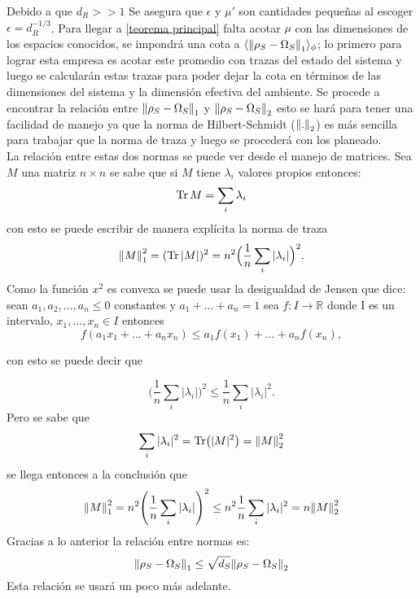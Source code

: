Debido a que $d_{R}>>1$ Se asegura que $\epsilon$ y $\mu'$ son cantidades pequeñas al escoger $\epsilon=d_{R}^{-1/3}$. Para llegar a \ref{teorema principal} falta acotar $\mu$ con las dimensiones de los espacios conocidos, se impondrá una cota a $\langle \norm{\rho_{S} -\Omega_{S}}_{1} \rangle_{\phi}$; lo primero  para lograr esta empresa es acotar este promedio con trazas del estado del sistema  y luego se calcularán estas trazas para poder dejar la cota en términos de las dimensiones del sistema y la dimensión efectiva del ambiente. Se procede a encontrar la relación entre $\norm{\rho_{S} -\Omega_{S}}_{1}$ y $\norm{\rho_{S} -\Omega_{S}}_{2}$ esto se hará para tener una facilidad de manejo ya que la norma de Hilbert-Schmidt ($\norm{.}_{2}$) es más sencilla para trabajar que la norma de traza y luego se procederá con los planeado.
\\
La relación entre estas dos normas se puede ver desde el manejo de matrices. Sea $M$ una matriz $n \times n$ se sabe que si $M$ tiene $\lambda_{i}$ valores propios entonces:
\begin{equation}
\Tr M= \sum_{i} \lambda_{i}
\end{equation}
con esto se puede escribir de manera explícita la norma de traza 
\begin{equation}
\norm{M}_{1}^2=(\Tr|M|)^{2}=n^{2} \Big( \frac{1}{n}\sum_{i} |\lambda_{i}| \Big)^{2}.
\end{equation}
Como la función $x^{2}$ es convexa se puede usar la desigualdad de Jensen que dice: sean $a_{1},a_{2},...,a_{n} \le 0$ constantes y $a_{1} +...+a_{n}=1$ sea $f: I \to \mathbb{R}$ donde I es un intervalo, $x_{1},...,x_{n} \in I$ entonces
\begin{equation}
f(a_{1}x_{1}+...+a_{n}x_{n}) \le a_{1}f(x_{1})+...+a_{n}f(x_{n}),
\end{equation}

con esto se puede decir que

\begin{equation}
\Big( \frac{1}{n}\sum_{i} |\lambda_{i}| \Big)^{2} \le \frac{1}{n}\sum_{i} |\lambda_{i}|^{2}.
\end{equation}
Pero se sabe que 
\begin{equation}
\sum_{i} |\lambda_{i}|^2= \Tr(|M|^2)=\norm{M}_{2}^{2}
\end{equation}
se llega entonces a la conclusión que 
\begin{equation}
\norm{M}_{1}^{2} = n^{2}\Bigg( \frac{1}{n} \sum_{i}| \lambda_{i} | \Bigg)^{2} \le  n^{2} \frac{1}{n} \sum_{i} | \lambda_{i} |^{2}= n\norm{M}_{2}^{2}
\end{equation}
Gracias a lo anterior la relación entre normas es:
\begin{equation}\label{eq:0}
\norm{\rho_{S} - \Omega_{S}}_{1} \le \sqrt{d_{S}}\norm{\rho_{S} - \Omega_{S}}_{2}
\end{equation}
Esta relación se usará un poco más adelante.\\

